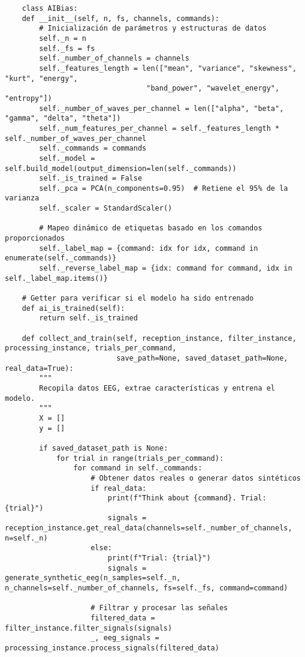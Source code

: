 \documentclass{article}
\begin{document}
\begin{lstlisting}
    class AIBias:
    def __init__(self, n, fs, channels, commands):
        # Inicialización de parámetros y estructuras de datos
        self._n = n
        self._fs = fs
        self._number_of_channels = channels
        self._features_length = len(["mean", "variance", "skewness", "kurt", "energy",
                                 "band_power", "wavelet_energy", "entropy"])
        self._number_of_waves_per_channel = len(["alpha", "beta", "gamma", "delta", "theta"])
        self._num_features_per_channel = self._features_length * self._number_of_waves_per_channel
        self._commands = commands
        self._model = self.build_model(output_dimension=len(self._commands))
        self._is_trained = False
        self._pca = PCA(n_components=0.95)  # Retiene el 95% de la varianza
        self._scaler = StandardScaler()

        # Mapeo dinámico de etiquetas basado en los comandos proporcionados
        self._label_map = {command: idx for idx, command in enumerate(self._commands)}
        self._reverse_label_map = {idx: command for command, idx in self._label_map.items()}

    # Getter para verificar si el modelo ha sido entrenado
    def ai_is_trained(self):
        return self._is_trained

    def collect_and_train(self, reception_instance, filter_instance, processing_instance, trials_per_command, 
                          save_path=None, saved_dataset_path=None, real_data=True):
        """
        Recopila datos EEG, extrae características y entrena el modelo.
        """
        X = []
        y = []

        if saved_dataset_path is None:
            for trial in range(trials_per_command):
                for command in self._commands:
                    # Obtener datos reales o generar datos sintéticos
                    if real_data:
                        print(f"Think about {command}. Trial: {trial}")
                        signals = reception_instance.get_real_data(channels=self._number_of_channels, n=self._n)
                    else:
                        print(f"Trial: {trial}")
                        signals = generate_synthetic_eeg(n_samples=self._n, n_channels=self._number_of_channels, fs=self._fs, command=command)
                    
                    # Filtrar y procesar las señales
                    filtered_data = filter_instance.filter_signals(signals)
                    _, eeg_signals = processing_instance.process_signals(filtered_data)


\end{lstlisting}
\end{document}
